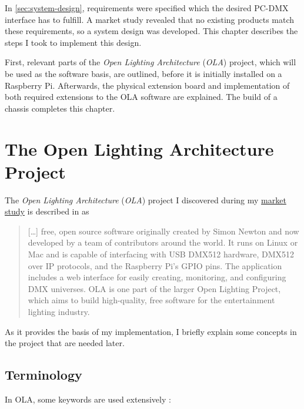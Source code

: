 In \cref{sec:system-design}, requirements were specified which the
desired PC-DMX interface has to fulfill. A market study revealed that no
existing products match these requirements, so a system design was
developed. This chapter describes the steps I took to implement this
design.

First, relevant parts of the \emph{Open Lighting Architecture}
(\emph{OLA}) project, which will be used as the software basis, are
outlined, before it is initially installed on a Raspberry Pi.
Afterwards, the physical extension board and implementation of both
required extensions to the OLA software are explained. The build of a
chassis completes this chapter.

\section{The Open Lighting Architecture Project}\label{sec:ola}

The \emph{Open Lighting Architecture} (\emph{OLA}) project I discovered
during my \protect\hyperlink{sec:market-study}{market study} is
described in \citep{lsa-dmx-tester} as

\begin{quote}
{[}\ldots{}{]} free, open source software originally created by Simon
Newton and now developed by a team of contributors around the world. It
runs on Linux or Mac and is capable of interfacing with USB DMX512
hardware, DMX512 over IP protocols, and the Raspberry Pi's GPIO pins.
The application includes a web interface for easily creating,
monitoring, and configuring DMX universes. OLA is one part of the larger
Open Lighting Project, which aims to build high-quality, free software
for the entertainment lighting industry.
\end{quote}

As it provides the basis of my implementation, I briefly explain some
concepts in the project that are needed later.

\subsection{Terminology}\label{terminology}

In OLA, some keywords are used extensively \citep{using-ola}:

